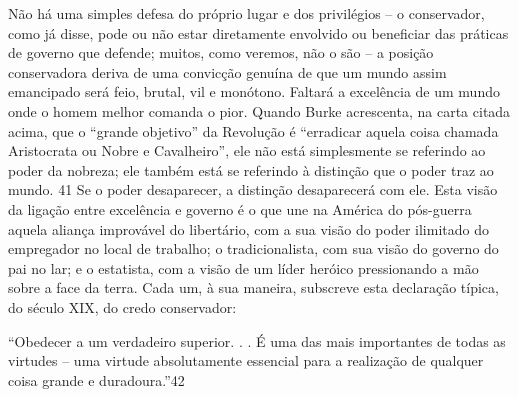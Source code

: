 Não há uma simples defesa do próprio lugar e dos privilégios – o conservador, como já disse, pode ou não estar diretamente envolvido ou beneficiar das práticas de governo que defende; muitos, como veremos, não o são – a posição conservadora deriva de uma convicção genuína de que um mundo assim emancipado será feio, brutal, vil e monótono. Faltará a excelência de um mundo onde o homem melhor comanda o pior. Quando Burke acrescenta, na carta citada acima, que o “grande objetivo” da Revolução é “erradicar aquela coisa chamada Aristocrata ou Nobre e Cavalheiro”, ele não está simplesmente se referindo ao poder da nobreza; ele também está se referindo à distinção que o poder traz ao mundo. {\color{blue}41} Se o poder desaparecer, a distinção desaparecerá com ele. Esta visão da ligação entre excelência e governo é o que une na América do pós-guerra aquela aliança improvável do libertário, com a sua visão do poder ilimitado do empregador no local de trabalho; o tradicionalista, com sua visão do governo do pai no lar; e o estatista, com a visão de um líder heróico pressionando a mão sobre a face da terra. Cada um, à sua maneira, subscreve esta declaração típica, do século XIX, do credo conservador:
 \par 
“Obedecer a um verdadeiro superior. . . É uma das mais importantes de todas as virtudes – uma virtude absolutamente essencial para a realização de qualquer coisa grande e duradoura.”{\color{blue}42}
 \par 
